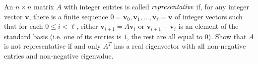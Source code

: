 An $n\times n$ matrix $A$ with integer  entries is called $\emph{representative}$ if, for any integer vector $\mathbf{v}$, there is a finite sequence $0=\mathbf{v}_0,\mathbf{v}_1,\dots,\mathbf{v}_\ell=\mathbf{v}$ of integer vectors such that for each $0\leq i <\ell$, either $\mathbf{v}_{i+1}=A\mathbf{v}_{i}$ or $\mathbf{v}_{i+1}-\mathbf{v}_i$ is an element of the standard basis (i.e. one of its entries is $1$, the rest are all equal to $0$). Show that $A$ is not representative if and only $A^T$ has a real eigenvector with all non-negative entries and non-negative eigenvalue.